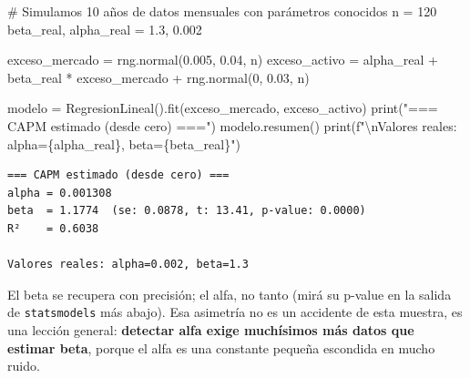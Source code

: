 \documentclass[
  spanish,
  letterpaper,
  DIV=11,
  numbers=noendperiod]{scrreprt}
\newenvironment{Shaded}{\begin{snugshade}}{\end{snugshade}}
\newcommand{\BuiltInTok}[1]{\textcolor[rgb]{0.00,0.23,0.31}{#1}}
\newcommand{\CharTok}[1]{\textcolor[rgb]{0.13,0.47,0.30}{#1}}
\newcommand{\CommentTok}[1]{\textcolor[rgb]{0.37,0.37,0.37}{#1}}
\newcommand{\DecValTok}[1]{\textcolor[rgb]{0.68,0.00,0.00}{#1}}
\newcommand{\FloatTok}[1]{\textcolor[rgb]{0.68,0.00,0.00}{#1}}
\newcommand{\NormalTok}[1]{\textcolor[rgb]{0.00,0.23,0.31}{#1}}
\newcommand{\OperatorTok}[1]{\textcolor[rgb]{0.37,0.37,0.37}{#1}}
\newcommand{\SpecialCharTok}[1]{\textcolor[rgb]{0.37,0.37,0.37}{#1}}
\newcommand{\SpecialStringTok}[1]{\textcolor[rgb]{0.13,0.47,0.30}{#1}}
\newcommand{\StringTok}[1]{\textcolor[rgb]{0.13,0.47,0.30}{#1}}
\begin{document}
\label{capm}
\begin{Shaded}
\begin{Highlighting}[]
\CommentTok{\# Simulamos 10 años de datos mensuales con parámetros conocidos}
\NormalTok{n }\OperatorTok{=} \DecValTok{120}
\NormalTok{beta\_real, alpha\_real }\OperatorTok{=} \FloatTok{1.3}\NormalTok{, }\FloatTok{0.002}

\NormalTok{exceso\_mercado }\OperatorTok{=}\NormalTok{ rng.normal(}\FloatTok{0.005}\NormalTok{, }\FloatTok{0.04}\NormalTok{, n)}
\NormalTok{exceso\_activo }\OperatorTok{=}\NormalTok{ alpha\_real }\OperatorTok{+}\NormalTok{ beta\_real }\OperatorTok{*}\NormalTok{ exceso\_mercado }\OperatorTok{+}\NormalTok{ rng.normal(}\DecValTok{0}\NormalTok{, }\FloatTok{0.03}\NormalTok{, n)}

\NormalTok{modelo }\OperatorTok{=}\NormalTok{ RegresionLineal().fit(exceso\_mercado, exceso\_activo)}
\BuiltInTok{print}\NormalTok{(}\StringTok{"=== CAPM estimado (desde cero) ==="}\NormalTok{)}
\NormalTok{modelo.resumen()}
\BuiltInTok{print}\NormalTok{(}\SpecialStringTok{f"}\CharTok{\textbackslash{}n}\SpecialStringTok{Valores reales: alpha=}\SpecialCharTok{\{}\NormalTok{alpha\_real}\SpecialCharTok{\}}\SpecialStringTok{, beta=}\SpecialCharTok{\{}\NormalTok{beta\_real}\SpecialCharTok{\}}\SpecialStringTok{"}\NormalTok{)}
\end{Highlighting}
\end{Shaded}

\begin{verbatim}
=== CAPM estimado (desde cero) ===
alpha = 0.001308
beta  = 1.1774  (se: 0.0878, t: 13.41, p-value: 0.0000)
R²    = 0.6038

Valores reales: alpha=0.002, beta=1.3
\end{verbatim}

El beta se recupera con precisión; el alfa, no tanto (mirá su p-value en
la salida de \texttt{statsmodels} más abajo). Esa asimetría no es un
accidente de esta muestra, es una lección general: \textbf{detectar alfa
exige muchísimos más datos que estimar beta}, porque el alfa es una
constante pequeña escondida en mucho ruido.
\end{document}
